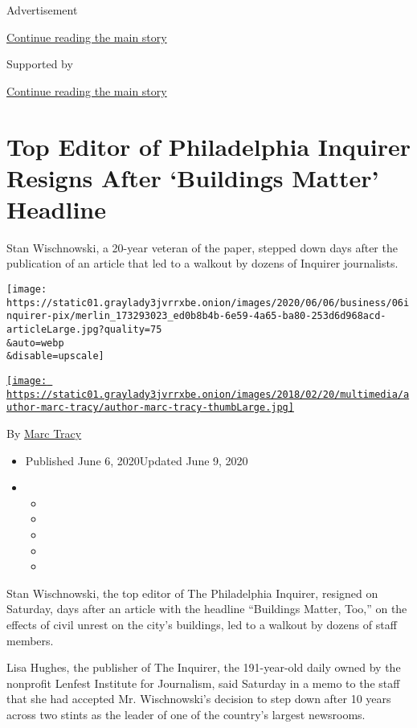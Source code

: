 Advertisement

\protect\hyperlink{after-top}{Continue reading the main story}

Supported by

\protect\hyperlink{after-sponsor}{Continue reading the main story}

\hypertarget{top-editor-of-philadelphia-inquirer-resigns-after-buildings-matter-headline}{%
\section{Top Editor of Philadelphia Inquirer Resigns After `Buildings
Matter'
Headline}\label{top-editor-of-philadelphia-inquirer-resigns-after-buildings-matter-headline}}

Stan Wischnowski, a 20-year veteran of the paper, stepped down days
after the publication of an article that led to a walkout by dozens of
Inquirer journalists.

\texttt{[image: https://static01.graylady3jvrrxbe.onion/images/2020/06/06/business/06inquirer-pix/merlin\_173293023\_ed0b8b4b-6e59-4a65-ba80-253d6d968acd-articleLarge.jpg?quality=75\\\&auto=webp\\\&disable=upscale]}

\href{https://www.nytimes3xbfgragh.onion/by/marc-tracy}{\texttt{[image: https://static01.graylady3jvrrxbe.onion/images/2018/02/20/multimedia/author-marc-tracy/author-marc-tracy-thumbLarge.jpg]}}

By \href{https://www.nytimes3xbfgragh.onion/by/marc-tracy}{Marc Tracy}

\begin{itemize}
\item
  Published June 6, 2020Updated June 9, 2020
\item
  \begin{itemize}
  \item
  \item
  \item
  \item
  \item
  \end{itemize}
\end{itemize}

Stan Wischnowski, the top editor of The Philadelphia Inquirer, resigned
on Saturday, days after an article with the headline ``Buildings Matter,
Too,'' on the effects of civil unrest on the city's buildings, led to a
walkout by dozens of staff members.

Lisa Hughes, the publisher of The Inquirer, the 191-year-old daily owned
by the nonprofit Lenfest Institute for Journalism, said Saturday in a
memo to the staff that she had accepted Mr. Wischnowski's decision to
step down after 10 years across two stints as the leader of one of the
country's largest newsrooms.

